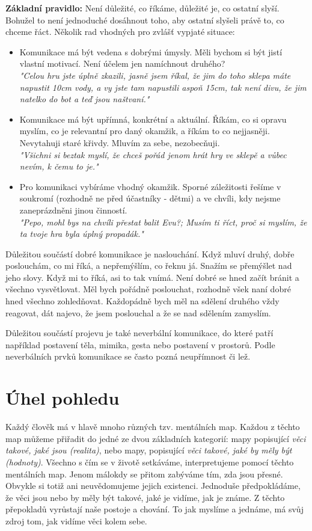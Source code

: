 \documentclass[a4paper,12pt,final]{report}
\begin{document}
\textbf{Základní pravidlo:} Není důležité, co říkáme, důležité je, co ostatní slyší. Bohužel to není jednoduché dosáhnout toho, aby ostatní slyšeli právě to, co chceme řáct. Několik rad vhodných pro zvlášť vypjaté situace:

\begin{itemize}
 \item Komunikace má být vedena s dobrými úmysly. Měli bychom si být jistí vlastní motivací. Není účelem jen namíchnout druhého?\\
 \textit{"Celou hru jste úplně zkazili, jasně jsem říkal, že jim do toho sklepa máte napustit 10cm vody, a vy jste tam napustili aspoň 15cm, tak není divu, že jim natelko do bot a teď jsou naštvaní."}
 
 \item Komunikace má být upřímná, konkrétní a aktuální. Říkám, co si opravu myslím, co je relevantní pro daný okamžik, a říkám to co nejjasněji. Nevytahuji staré křivdy. Mluvím za sebe, nezobecňuji.\\
 \textit{"Všichni si beztak myslí, že chceš pořád jenom hrát hry ve sklepě a vůbec nevím, k čemu to je."}
 
 \item Pro komunikaci vybíráme vhodný okamžik. Sporné záležitosti řešíme v soukromí (rozhodně ne před účastníky - dětmi) a ve chvíli, kdy nejsme zaneprázdněni jinou činností.\\
 \textit{"Pepo, mohl bys na chvíli přestat balit Evu?; Musím ti říct, proč si myslím, že ta tvoje hra byla úplný propadák."}
\end{itemize}

Důležitou součástí dobré komunikace je naslouchání. Když mluví druhý, dobře poslouchám, co mi říká, a nepřemýšlím, co řeknu já. Snažím se přemýšlet nad jeho slovy. Když mi to říká, asi to tak vnímá. Není dobré se hned začít bránit a všechno vysvětlovat. Měl bych pořádně poslouchat, rozhodně všek naní dobré hned všechno zohledňovat. Každopádně bych měl na sdělení druhého vždy reagovat, dát najevo, že jsem poslouchal a že se nad sdělením zamyslím.

Důležitou součástí projevu je také neverbální komunikace, do které patří například postavení těla, mimika, gesta nebo postavení v prostorů. Podle neverbálních prvků komunikace se často pozná neupřímnost či lež.

\section[Úhel pohledu]{Úhel pohledu}
\pagelogos
Každý člověk má v hlavě mnoho různých tzv. mentálních map. Každou z těchto map můžeme přiřadit do jedné ze dvou základních kategorií: mapy popisující \textit{věci takové, jaké jsou (realita)}, nebo mapy, popisující \textit{věci takové, jaké by měly být (hodnoty)}. Všechno s čím se v životě setkáváme, interpretujeme pomocí těchto mentálních map. Jenom málokdy se přitom zabýváme tím, zda jsou přesné. Obvykle si totiž ani neuvědomujeme jejich existenci. Jednoduše předpokládáme, že věci jsou nebo by měly být takové, jaké je vidíme, jak je známe.
Z těchto přepokladů vyrůstají naše postoje a chování. To jak myslíme a jednáme, má svůj zdroj tom, jak vidíme věci kolem sebe.
\end{document}
